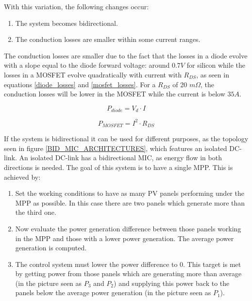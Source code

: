 \noindent With this variation, the following changes occur:
		
\begin{enumerate}
	\item The system becomes bidirectional.
	\item The conduction losses are smaller within some current ranges. 
\end{enumerate}

The conduction losses are smaller due to the fact that the losses in a diode evolve with a slope equal to the diode forward voltage: around $0.7V$ for silicon while the losses in a MOSFET evolve quadratically with current with $R_{DS}$, as seen in equations \ref{diode_losses} and \ref{mosfet_losses}. For a $R_{DS}$ of 20 $m\Omega$, the conduction losses will be lower in the MOSFET while the current is below $35 A$. 

\begin{equation}	\label{diode_losses}
	P_{diode} = V_d \cdot I
\end{equation}
	
\begin{equation}	\label{mosfet_losses}
	P_{MOSFET} = I^2 \cdot R_{DS}
\end{equation}


If the system is bidirectional it can be used for different purposes, as the topology seen in figure \ref{BID_MIC_ARCHITECTURES}, which features an isolated DC-link. 
An isolated DC-link has a bidirectional MIC, as energy flow in both directions is needed. The goal of this system is to have a single MPP. This is achieved by:

\begin{enumerate}
	\item Set the working conditions to have as many PV  panels performing under the MPP as possible. In this case there are two panels which generate more than the third one.
	\item Now evaluate the power generation difference between those panels working in the MPP and those with a lower power generation. The average power generation is computed.
	\item The control system must lower the power difference to 0. This target is met by getting power from those panels which are generating more than average (in the picture seen as $P_{3}$ and $P_{2}$) and supplying this power back to the panels below the average power generation (in the picture seen as $P_{1}$).
\end{enumerate}

